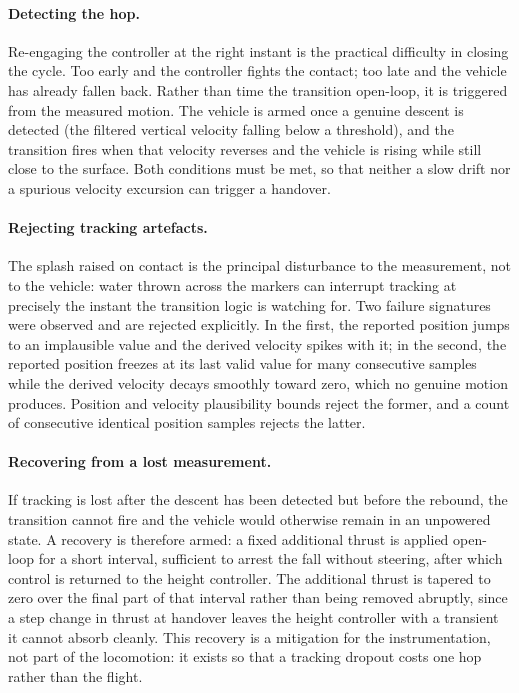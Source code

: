 \paragraph{Detecting the hop.}
Re-engaging the controller at the right instant is the practical difficulty in
closing the cycle.  Too early and the controller fights the contact; too late
and the vehicle has already fallen back.  Rather than time the transition
open-loop, it is triggered from the measured motion.  The vehicle is armed
once a genuine descent is detected (the filtered vertical velocity falling
below a threshold), and the transition fires when that velocity reverses and
the vehicle is rising while still close to the surface.  Both conditions must
be met, so that neither a slow drift nor a spurious velocity excursion can
trigger a handover.

\paragraph{Rejecting tracking artefacts.}
The splash raised on contact is the principal disturbance to the measurement,
not to the vehicle: water thrown across the markers can interrupt tracking at
precisely the instant the transition logic is watching for.  Two failure
signatures were observed and are rejected explicitly.  In the first, the
reported position jumps to an implausible value and the derived velocity
spikes with it; in the second, the reported position freezes at its last valid
value for many consecutive samples while the derived velocity decays smoothly
toward zero, which no genuine motion produces.  Position and velocity
plausibility bounds reject the former, and a count of consecutive identical
position samples rejects the latter.

\paragraph{Recovering from a lost measurement.}
If tracking is lost after the descent has been detected but before the
rebound, the transition cannot fire and the vehicle would otherwise remain in
an unpowered state.  A recovery is therefore armed: a fixed additional thrust
is applied open-loop for a short interval, sufficient to arrest the fall
without steering, after which control is returned to the height controller.
The additional thrust is tapered to zero over the final part of that interval
rather than being removed abruptly, since a step change in thrust at handover
leaves the height controller with a transient it cannot absorb cleanly.  This
recovery is a mitigation for the instrumentation, not part of the locomotion:
it exists so that a tracking dropout costs one hop rather than the flight.


